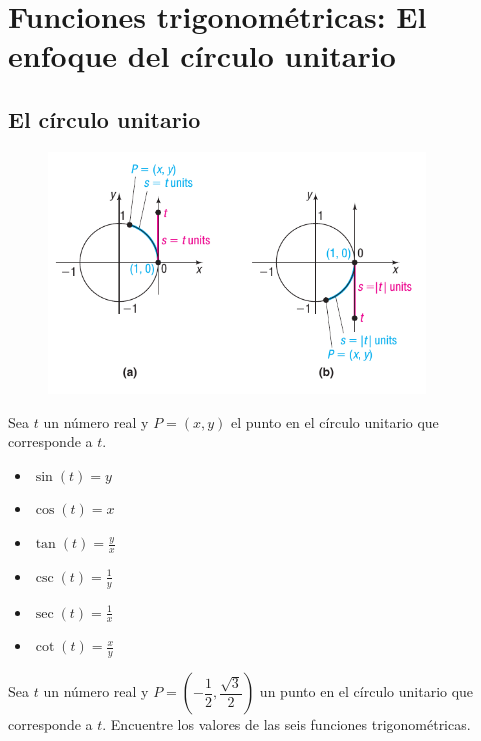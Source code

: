 	

\section{Funciones trigonométricas: El enfoque del círculo unitario}
\subsection{El círculo unitario}
{}
	\begin{figure}
		\centering
		\includegraphics[width=10cm,keepaspectratio=true]{./trig/sull0618.png}
		\label{fig:0618}
	\end{figure}
	

{}
	\begin{definicion}
		Sea $t$ un número real y $P=(x,y)$ el punto en el círculo unitario que corresponde a $t$.
		\begin{multicols}{2}
			\begin{itemize}
				\item $\sin(t)=y$
				\item $\cos(t)=x$
				\item $\tan(t)=\frac{y}{x}$
				\item $\csc(t)=\frac{1}{y}$
				\item $\sec(t)=\frac{1}{x}$
				\item $\cot(t)=\frac{x}{y}$
			\end{itemize}
		\end{multicols}
	\end{definicion}

{}
	\begin{problema}
		\label{exmp:sull0601}
		Sea $t$ un número real y $P=\left(-\dfrac{1}{2}, \dfrac{\sqrt{3}}{2}  \right)$
		un punto en el círculo unitario que corresponde a $t$.  Encuentre los valores de las seis funciones trigonométricas.
	\end{problema}
	

